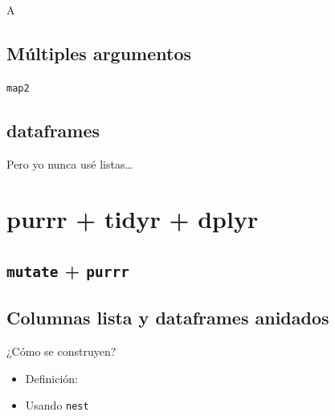 \documentclass[ignorenonframetext,]{beamer}
\providecommand{\tightlist}{%
	\setlength{\itemsep}{0pt}\setlength{\parskip}{0pt}}
\begin{document}
\begin{frame}{A}
\protect\hypertarget{a-4}{}
\end{frame}

\hypertarget{muxfaltiples-argumentos}{%
\subsection{Múltiples argumentos}\label{muxfaltiples-argumentos}}

\begin{frame}{\texttt{map2}}
\protect\hypertarget{section}{}
\end{frame}

\hypertarget{dataframes}{%
\subsection{dataframes}\label{dataframes}}

\begin{frame}{Pero yo nunca usé listas\ldots{}}
\protect\hypertarget{pero-yo-nunca-usuxe9-listas}{}
\end{frame}

\hypertarget{purrr-tidyr-dplyr}{%
\section{purrr + tidyr + dplyr}\label{purrr-tidyr-dplyr}}

\hypertarget{section-1}{%
\subsection{\texorpdfstring{\texttt{mutate} +
\texttt{purrr}}{ + }}\label{section-1}}

\hypertarget{columnas-lista-y-dataframes-anidados}{%
\subsection{Columnas lista y dataframes
anidados}\label{columnas-lista-y-dataframes-anidados}}

\begin{frame}{¿Cómo se construyen?}
\protect\hypertarget{cuxf3mo-se-construyen}{}
\begin{itemize}
\tightlist
\item
  Definición:
\item
  Usando \texttt{nest}
\end{itemize}
\end{frame}
\end{document}

